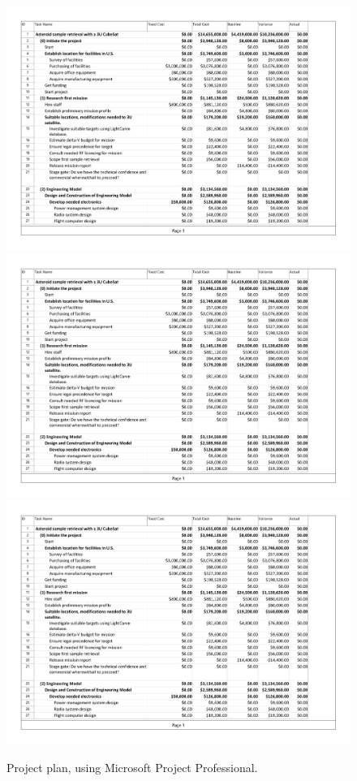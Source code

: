 \documentclass[conference]{IEEEtran}
\begin{document}
\begin{figure}[H]
\centering
\includegraphics[page=1, width=\linewidth]{project_inital.pdf}
\includegraphics[page=2, width=\linewidth]{project_inital.pdf}
\includegraphics[page=3, width=\linewidth]{project_inital.pdf}
\caption{\label{fig:proj}Project plan, using Microsoft Project Professional.}
\end{figure}
\end{document}
